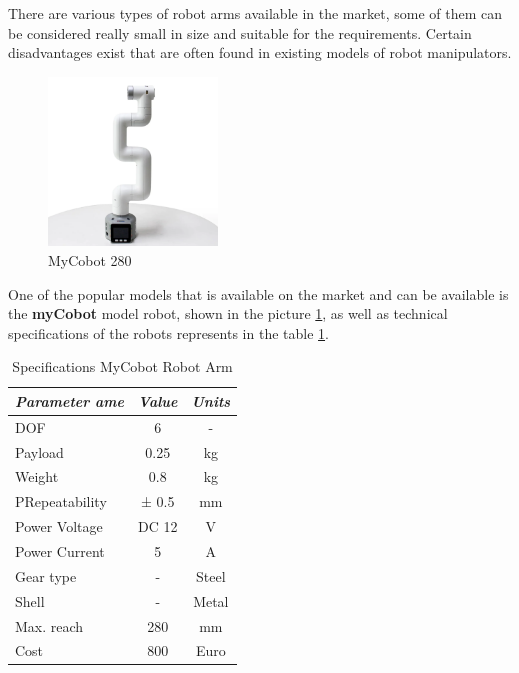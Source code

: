 
There are various types of robot arms available in the market, some of them can be considered really small in size and suitable for the requirements.
Certain disadvantages exist that are often found in existing models of robot manipulators.





\begin{figure}[H]
	\centering
	\includegraphics[width=0.4\textwidth]{Src/images/myCobot.png}
	\caption{MyCobot 280}
    \label{mycobot1}
    
\end{figure}
One of the popular models that is available on the market and can be available is the \textbf{myCobot} model robot, shown in the picture \ref*{mycobot1}, as well as technical specifications of the robots represents in the table \ref*{tab:mycobot1}.


\begin{table}[H]
    \caption{Specifications MyCobot Robot Arm}\label{tab:mycobot1}
    \centering
    \begin{tabular}{|l|c|c|}
        \hline
        \textit{\textbf{Parameter ame}} & \multicolumn{1}{l|}{\textit{\textbf{Value}}} & \multicolumn{1}{l|}{\textit{\textbf{Units}}} \\ \hline
        DOF                  & 6     & -     \\ \hline
        Payload              & 0.25  & kg    \\ \hline
        Weight               & 0.8   & kg    \\ \hline
        PRepeatability & ± 0.5 & mm    \\ \hline
        Power Voltage        & DC 12 & V     \\ \hline
        Power Current        & 5     & A     \\ \hline
        Gear type            & -     & Steel \\ \hline
        Shell                & -     & Metal \\ \hline
        Max. reach           & 280     & mm \\ \hline
        Cost                & 800    & Euro \\ \hline
        \end{tabular}
 \end{table}

